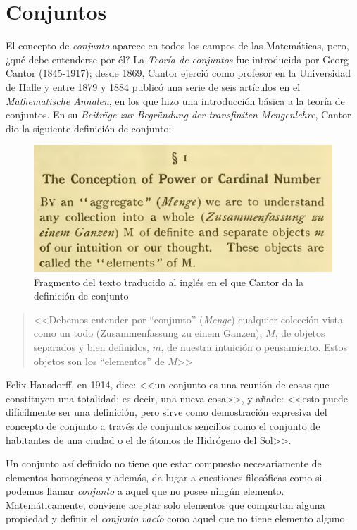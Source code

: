 \label{cap:Conjuntos}
\chapter{Conjuntos}

El concepto de \textit{conjunto} aparece en todos los campos de las
Matemáticas, pero, ¿qué debe entenderse por él? La \textit{Teoría de conjuntos}
fue introducida por Georg Cantor (1845-1917); desde 1869, Cantor ejerció como
profesor en la Universidad de Halle y entre 1879 y 1884 publicó una serie de
seis artículos en el \textit{Mathematische Annalen}, en los que hizo una
introducción básica a la teoría de conjuntos. En su \textit{Beiträge zur
Begründung der transfiniten Mengenlehre}, Cantor dio la siguiente definición
de conjunto:

\begin{figure}[h]
  \centering
  \includegraphics[scale=.2]{fig/definicionConjunto}
  \captionsetup{font=footnotesize}
  \caption{Fragmento del texto traducido al inglés en el que Cantor da la
    definición de conjunto}
\end{figure}

\begin{quote}
  <<Debemos entender por ``conjunto'' (\textit{Menge}) cualquier colección
  vista como un todo (Zusammenfassung zu einem Ganzen), $M$, de objetos
  separados y bien definidos, $m$, de nuestra intuición o pensamiento. Estos
  objetos son los ``elementos'' de $M$>>
\end{quote}

Felix Hausdorff, en 1914, dice: <<un conjunto es una reunión de cosas que
constituyen una totalidad; es decir, una nueva cosa>>, y añade: <<esto puede
difícilmente ser una definición, pero sirve como demostración expresiva del
concepto de conjunto a través de conjuntos sencillos como el conjunto de
habitantes de una ciudad o el de átomos de Hidrógeno del Sol>>.

Un conjunto así definido no tiene que estar compuesto necesariamente de
elementos homogéneos y además, da lugar a cuestiones filosóficas como si
podemos llamar \textit{conjunto} a aquel que no posee ningún elemento.
Matemáticamente, conviene aceptar solo elementos que compartan alguna propiedad
y definir el \textit{conjunto vacío} como aquel que no tiene elemento alguno.

